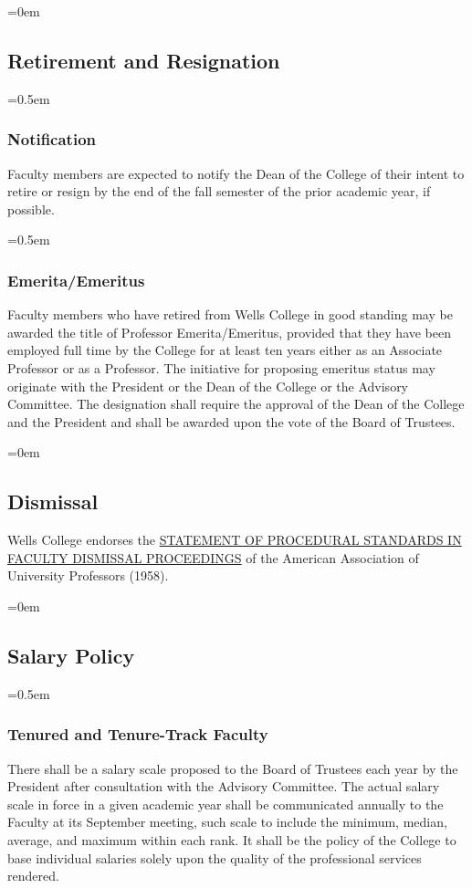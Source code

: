 \documentclass{manual}
\let\oldsubsection\subsection
\renewcommand\subsection{\leftskip=0em\oldsubsection}
\let\oldsubsubsection\subsubsection
\renewcommand\subsubsection{\leftskip=0.5em\oldsubsubsection}
\begin{document}
\subsection{Retirement and Resignation}

\subsubsection{Notification}
Faculty members are expected to notify the Dean of the College of their intent to retire or resign by the end of the fall semester of the prior academic year, if possible.

\subsubsection{Emerita/Emeritus}
Faculty members who have retired from Wells College in good standing may be awarded the title of Professor Emerita/Emeritus, provided that they have been employed full time by the College for at least ten years either as an Associate Professor or as a Professor. The initiative for proposing emeritus status may originate with the President or the Dean of the College or the Advisory Committee. The designation shall require the approval of the Dean of the College and the President and shall be awarded upon the vote of the Board of Trustees.

\subsection{Dismissal}\label{sec:Dismissal}
Wells College endorses the \href{http://www.aaup.org/AAUP/pubsres/policydocs/contents/statementon+proceduralstandardsinFaculty+dismissal+proceedings.htm}{STATEMENT OF PROCEDURAL STANDARDS IN FACULTY DISMISSAL PROCEEDINGS} of the American Association of University Professors (1958).

\subsection{Salary Policy}\label{sec:SalaryPolicy}

\subsubsection{Tenured and Tenure-Track Faculty}
There shall be a salary scale proposed to the Board of Trustees each year by the President after consultation with the Advisory Committee.
The actual salary scale in force in a given academic year shall be communicated annually to the Faculty at its September meeting, such scale to include the minimum, median, average, and maximum within each rank. It shall be the policy of the College to base individual salaries solely upon the quality of the professional services rendered. 
\end{document}
